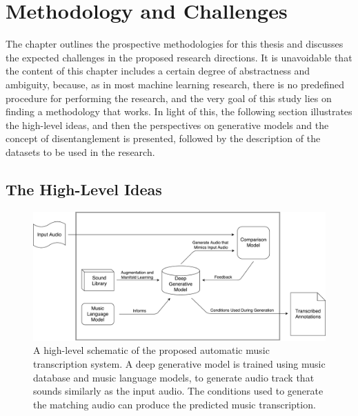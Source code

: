 
\graphicspath{{4-methods/figures/}}
\chapter{Methodology and Challenges}
\label{ch:methods}

The chapter outlines the prospective methodologies for this thesis and discusses the expected challenges in the proposed research directions.
It is unavoidable that the content of this chapter includes a certain degree of abstractness and ambiguity, because, as in most machine learning research, there is no predefined procedure for performing the research, and the very goal of this study lies on finding a methodology that works.
In light of this, the following section illustrates the high-level ideas, and then the perspectives on generative models and the concept of disentanglement is presented, followed by the description of the datasets to be used in the research.


\section{The High-Level Ideas}

\begin{figure}
	\includegraphics[width=\textwidth]{grand.pdf}
	\caption{A high-level schematic of the proposed automatic music transcription system. A deep generative model is trained using music database and music language models, to generate audio track that sounds similarly as the input audio. The conditions used to generate the matching audio can produce the predicted music transcription. }\label{fig:grand}
\end{figure}

